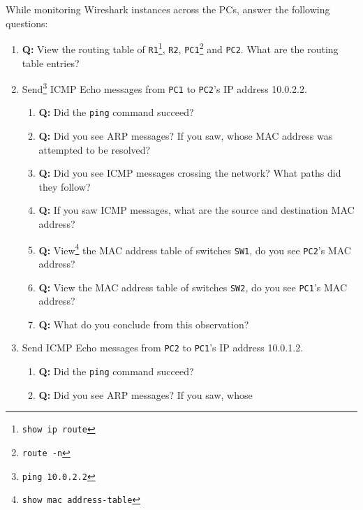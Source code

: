 \documentclass[pdftex,12pt,a4paper]{article}
\begin{document}
            While monitoring Wireshark instances across the PCs, answer the following questions:
            \begin{enumerate}
                \item \textbf{Q:} View the routing table of
                    \texttt{R1}\footnote{\texttt{show ip
                    route}}, \texttt{R2},
                    \texttt{PC1}\footnote{\texttt{route -n}} and \texttt{PC2}. What are
                    the routing table entries?
                \item Send\footnote{\texttt{ping 10.0.2.2}} ICMP Echo messages from \texttt{PC1} to
                    \texttt{PC2}'s IP address 10.0.2.2.
                    \begin{enumerate}
                        \item \textbf{Q:} Did the \texttt{ping} command succeed?
                        \item \textbf{Q:} Did you see ARP messages? If you saw, whose
                            MAC address was attempted to be resolved?
                        \item \textbf{Q:} Did you see ICMP messages crossing the
                            network? What paths did they follow?
                        \item \textbf{Q:} If you saw ICMP messages, what are
                            the source and destination MAC address?
                        \item \textbf{Q:} View\footnote{\texttt{show mac
                            address-table}} the MAC address table of
                            switches \texttt{SW1}, do you see \texttt{PC2}'s MAC address?
                        \item \textbf{Q:} View the MAC address table of
                            switches \texttt{SW2}, do you see \texttt{PC1}'s MAC address?
                        \item \textbf{Q:} What do you conclude from this observation?
                    \end{enumerate}
                \item Send ICMP Echo messages from \texttt{PC2} to \texttt{PC1}'s IP address
                    10.0.1.2.
                    \begin{enumerate}
                        \item \textbf{Q:} Did the \texttt{ping} command succeed?
                        \item \textbf{Q:} Did you see ARP messages? If you saw, whose

\end{enumerate}
\end{enumerate}
\end{document}
